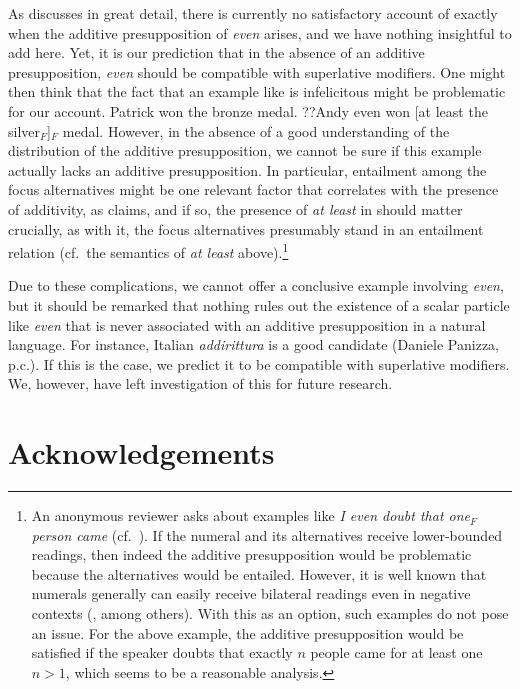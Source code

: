 \documentclass[output=paper]{langscibook}
\begin{document}
As \citet{crnic} discusses in great detail, there is currently no satisfactory account of exactly when the additive presupposition of \textit{even} arises, and we have nothing insightful to add here. Yet, it is our prediction that in the absence of an additive presupposition, \textit{even} should be compatible with superlative modifiers. One might then think that the fact that an example like  is infelicitous might be problematic for our account.
\ea Patrick won the bronze medal. ??Andy even won [at least the silver$_F$]$_F$ medal.\label{don-sud:evensilver}\z
However, in the absence of a good understanding of the distribution of the additive presupposition, we cannot be sure if this example actually lacks an additive presupposition. In particular, entailment among the focus alternatives might be one relevant factor that correlates with the presence of additivity, as \citet{crnic} claims, and if so, the presence of \textit{at least} in  should matter crucially, as with it, the focus alternatives presumably stand in an entailment relation (cf.\ the semantics of \textit{at least} above).\footnote{An anonymous reviewer asks about examples like \textit{I even doubt that one$_F$ person came} (cf.\ \citealt{crnic}). If the numeral and its alternatives receive lower-bounded readings, then indeed the additive presupposition would be problematic because the alternatives would be entailed. However, it is well known that numerals generally can easily receive bilateral readings even in negative contexts (\citealt{geurts, breheny}, among others). With this as an option, such examples do not pose an issue. For the above example, the additive presupposition would be satisfied if the speaker doubts that exactly $n$ people came for at least one $n>1$, which seems to be a reasonable analysis.}

Due to these complications, we cannot offer a conclusive example involving \textit{even}, but it should be remarked that nothing rules out the existence of a scalar particle like \textit{even} that is never associated with an additive presupposition in a natural language. For instance, Italian \textit{addirittura} is a good candidate (Daniele Panizza, p.c.). If this is the case, we predict it to be compatible with superlative modifiers. We, however, have left investigation of this for future research.


\section*{Acknowledgements}
\end{document}

